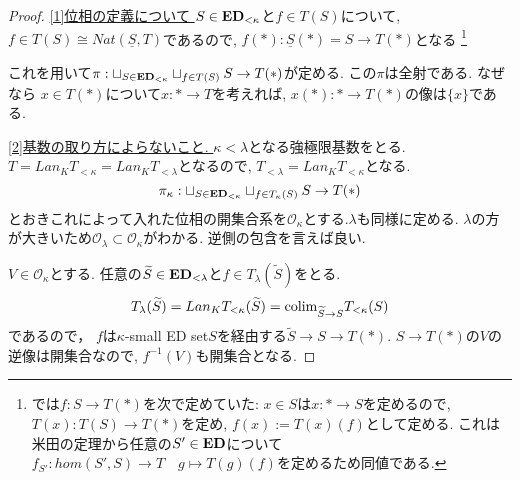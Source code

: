 \documentclass[dvipdfmx,a4paper,11pt]{article}
\newcommand{\colim}{{\rm colim}}
\theoremstyle{definition}
\newcommand{\xr}[1]{\textcolor{red}{#1}}
\begin{document}
\begin{proof}
\underline{[1]位相の定義について }
$S \in {\bf ED}_{<\kappa}$と$f \in T(S)$について, 
$f \in T(S) \cong Nat(\underline{S}, T)$であるので, 
$f(\ast) : \underline{S}(\ast)=S \to T(\ast)$となる
\footnote{\cite{Bar22}では$f : S \to T(\ast)$を次で定めていた: $x \in S$は$x : \ast \to S$を定めるので, $T(x) : T(S) \to T(\ast)$を定め, $f(x):=T(x)(f)$として定める. これは米田の定理から任意の$S' \in {\bf ED}$について$f_{S'} : hom(S', S) \to T \quad g \mapsto T(g)(f)$を定めるため同値である.}

これを用いて$\pi : \sqcup_{S \in {\bf ED}_{<\kappa}}  \sqcup_{f \in T(S) }  S \to T(\ast)$が定める. 
この$\pi$は全射である. なぜなら
$x \in T(\ast)$について$x : \ast \to T$を考えれば,
$x(\ast) : \ast \to T(\ast)$の像は$\{ x\}$である. 


\underline{[2]基数の取り方によらないこと. }
$\kappa < \lambda$となる強極限基数をとる.
$T = Lan_{K}T_{<\kappa} = Lan_{K}T_{<\lambda} $となるので,
$T_{<\lambda} =Lan_{K}T_{<\kappa} $となる.
$$
\pi_{\kappa} : \sqcup_{S \in {\bf ED}_{<\kappa}}  \sqcup_{f \in T_{\kappa}(S) }  S \to T(\ast)
$$
とおきこれによって入れた位相の開集合系を$\mathcal{O}_{\kappa}$とする.$\lambda$も同様に定める.
$\lambda$の方が大きいため$\mathcal{O}_{\lambda} \subset \mathcal{O}_{\kappa}$がわかる.
逆側の包含を言えば良い.

$V \in \mathcal{O}_{\kappa}$とする. 
任意の$\widetilde{S} \in {\bf ED}_{<\lambda}$と$f \in T_{\lambda}(\widetilde{S})$をとる.
$$
 T_{\lambda}(\widetilde{S})=Lan_{K}T_{<\kappa}(\widetilde{S})
 = \colim_{\widetilde{S} \to S} T_{<\kappa}(S)
$$
であるので， $f$は$\kappa$-small ED set$S$を経由する$\widetilde{S} \to S \to T(\ast)$.
$S \to T(\ast)$の$V$の逆像は開集合なので, $f^{-1}(V)$も開集合となる.
\end{proof}
\end{document}
